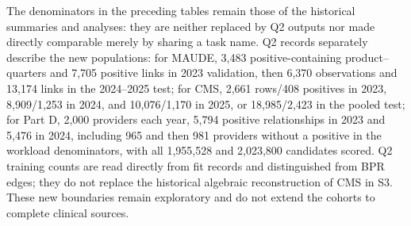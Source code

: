 \documentclass[10pt,a4paper]{article}
\begin{document}
The denominators in the preceding tables remain those of the historical summaries and analyses: they are neither replaced by Q2 outputs nor made directly comparable merely by sharing a task name. Q2 records separately describe the new populations: for MAUDE, 3,483 positive-containing product--quarters and 7,705 positive links in 2023 validation, then 6,370 observations and 13,174 links in the 2024--2025 test; for CMS, 2,661 rows/408 positives in 2023, 8,909/1,253 in 2024, and 10,076/1,170 in 2025, or 18,985/2,423 in the pooled test; for Part D, 2,000 providers each year, 5,794 positive relationships in 2023 and 5,476 in 2024, including 965 and then 981 providers without a positive in the workload denominators, with all 1,955,528 and 2,023,800 candidates scored. Q2 training counts are read directly from fit records and distinguished from BPR edges; they do not replace the historical algebraic reconstruction of CMS in S3. These new boundaries remain exploratory and do not extend the cohorts to complete clinical sources.
\end{document}

